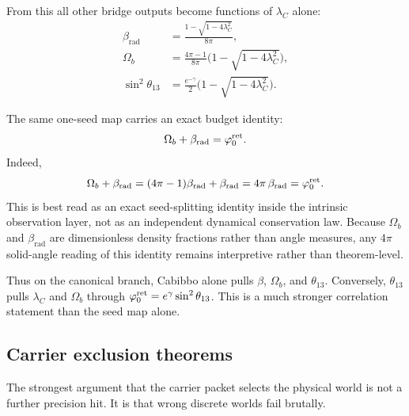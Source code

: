 From this all other bridge outputs become functions of $\lambda_C$ alone:
\begin{equation}
\label{eq:lambda-c-master}
\begin{aligned}
\beta_{\mathrm{rad}}&=\frac{1-\sqrt{1-4\lambda_C^2}}{8\pi},\\
\Omega_b&=\frac{4\pi-1}{8\pi}\bigl(1-\sqrt{1-4\lambda_C^2}\bigr),\\
\sin^2\theta_{13}&=\frac{e^{-\gamma}}{2}\bigl(1-\sqrt{1-4\lambda_C^2}\bigr).
\end{aligned}
\end{equation}
\begin{remark}
The same one-seed map carries an exact budget identity:
\begin{equation}
\label{eq:seed-budget-identity}
\Omega_b+\beta_{\mathrm{rad}}=\varphi_0^{\mathrm{ret}}.
\end{equation}
Indeed,
\[
\Omega_b+\beta_{\mathrm{rad}}
=(4\pi-1)\beta_{\mathrm{rad}}+\beta_{\mathrm{rad}}
=4\pi\,\beta_{\mathrm{rad}}
=\varphi_0^{\mathrm{ret}}.
\]
This is best read as an exact seed-splitting identity inside the intrinsic observation layer, not
as an independent dynamical conservation law.
Because $\Omega_b$ and $\beta_{\mathrm{rad}}$ are dimensionless density fractions rather than angle measures, any $4\pi$ solid-angle reading of this identity remains interpretive rather than theorem-level.
\end{remark}

Thus on the canonical branch, Cabibbo alone pulls $\beta$, $\Omega_b$, and $\theta_{13}$. Conversely, $\theta_{13}$ pulls $\lambda_C$ and $\Omega_b$ through $\varphi_0^{\mathrm{ret}}=e^\gamma\sin^2\theta_{13}$. This is a much stronger correlation statement than the seed map alone.

\subsection{Carrier exclusion theorems}

The strongest argument that the carrier packet selects the physical world is not a further precision hit. It is that wrong discrete worlds fail brutally.

